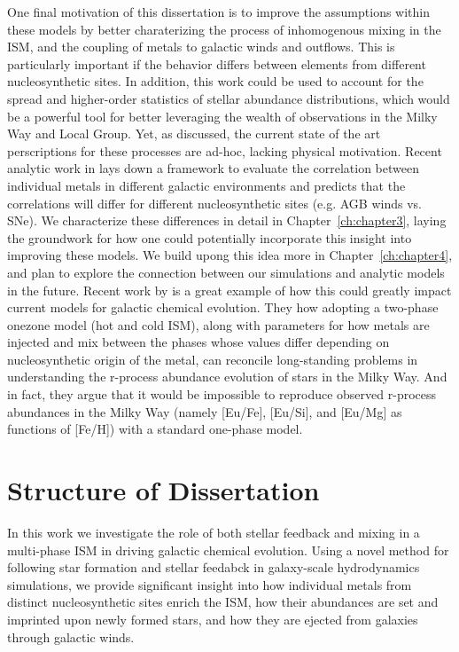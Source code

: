 One final motivation of this dissertation is to improve the assumptions within these models by better charaterizing the process of inhomogenous mixing in the ISM, and the coupling of metals to galactic winds and outflows. This is particularly important if the behavior differs between elements from different nucleosynthetic sites. In addition, this work could be used to account for the spread and higher-order statistics of stellar abundance distributions, which would be a powerful tool for better leveraging the wealth of observations in the Milky Way and Local Group. Yet, as discussed, the current state of the art perscriptions for these processes are ad-hoc, lacking physical motivation. Recent analytic work in \cite{KrumholzTing2018} lays down a framework to evaluate the correlation between individual metals in different galactic environments and predicts that the correlations will differ for different nucleosynthetic sites (e.g. AGB winds vs. SNe). We characterize these differences in detail in Chapter~\ref{ch:chapter3}, laying the groundwork for how one could potentially incorporate this insight into improving these models. We build upong this idea more in Chapter~\ref{ch:chapter4}, and plan to explore the connection between our simulations and analytic models in the future. Recent work by \cite{SchonrichWeinberg2019} is a great example of how this could greatly impact current models for galactic chemical evolution. They how adopting a two-phase onezone model (hot and cold ISM), along with parameters for how metals are injected and mix between the phases whose values differ depending on nucleosynthetic origin of the metal, can reconcile long-standing problems in understanding the r-process abundance evolution of stars in the Milky Way. And in fact, they argue that it would be impossible to reproduce observed r-process abundances in the Milky Way (namely [Eu/Fe], [Eu/Si], and [Eu/Mg] as functions of [Fe/H]) with a standard one-phase model.


\section{Structure of Dissertation}\label{intro:sec:structure}

In this work we investigate the role of both stellar feedback and mixing in a multi-phase ISM in driving galactic chemical evolution. Using a novel method for following star formation and stellar feedabck in galaxy-scale hydrodynamics simulations, we provide significant insight into how individual metals from distinct nucleosynthetic sites enrich the ISM, how their abundances are set and imprinted upon newly formed stars, and how they are ejected from galaxies through galactic winds. 

